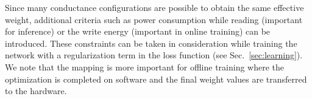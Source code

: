 \documentclass[english]{article}
\newcommand{\refsec}[1]{{Sec.~\ref{#1}}}
\begin{document}
%
%
%
Since many conductance configurations are possible to obtain the same effective weight, additional criteria such as power consumption while reading (important for inference) or the write energy (important in online training) can be introduced.
These constraints can be taken in consideration while training the network with a regularization term in the loss function (see \refsec{sec:learning}). 
We note that the mapping is more important for offline training where the optimization is completed on software and the final weight values are transferred to the hardware.




\end{document}
